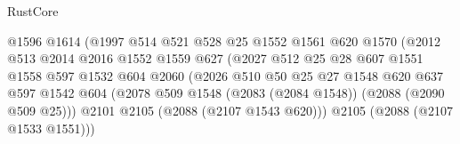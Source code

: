 \begin{lexlean}{RustCore}
\begin{coremodule}
                                        @1596
                                        @1614
                                        (@1997
                                          @514
                                          @521
                                          @528
                                          @25
                                          @1552
                                          @1561
                                          @620
                                          @1570
                                          (@2012
                                            @513
                                            @2014
                                            @2016
                                            @1552
                                            @1559
                                            @627
                                            (@2027
                                              @512
                                              @25
                                              @28
                                              @607
                                              @1551
                                              @1558
                                              @597
                                              @1532
                                              @604
                                              @2060
                                              (@2026
                                                @510
                                                @50
                                                @25
                                                @27
                                                @1548
                                                @620
                                                @637
                                                @597
                                                @1542
                                                @604
                                                (@2078
                                                  @509
                                                  @1548
                                                  (@2083 (@2084 @1548))
                                                  (@2088 (@2090 @509 @25)))
                                                @2101
                                                @2105
                                                (@2088 (@2107 @1543 @620)))
                                              @2105
                                              (@2088 (@2107 @1533 @1551)))

\end{coremodule}
\end{lexlean}
